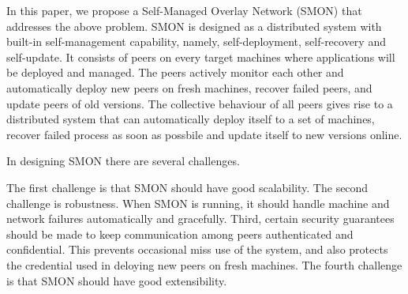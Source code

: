In this paper, we propose a Self-Managed Overlay Network
(SMON) that addresses the above problem. SMON is designed as
a distributed system with built-in self-management
capability, namely, self-deployment, self-recovery and
self-update. It consists of peers on every target machines
where applications will be deployed and managed. The peers
actively monitor each other and automatically deploy new
peers on fresh machines, recover failed peers, and update
peers of old versions. The collective behaviour of all peers
gives rise to a distributed system that can automatically
deploy itself to a set of machines, recover failed process
as soon as possbile and update itself to new versions
online.




In designing SMON there are several challenges.


The first challenge is that SMON should have good
scalability. The second challenge is robustness. When SMON
is running, it should handle machine and network failures
automatically and gracefully. Third, certain security
guarantees should be made to keep communication among peers
authenticated and confidential. This prevents occasional
miss use of the system, and also protects the credential
used in deloying new peers on fresh machines. The fourth
challenge is that SMON should have good extensibility.

